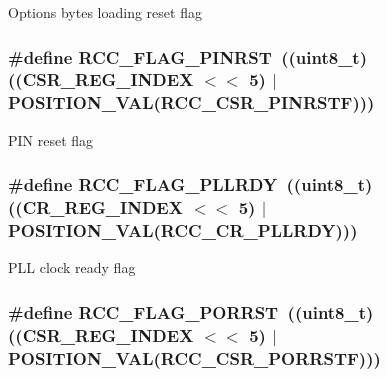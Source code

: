 Options bytes loading reset flag \hypertarget{group___r_c_c___flag_gabfc3ab5d4a8a94ec1c9f38794ce37ad6}{
\subsubsection[{R\-C\-C\-\_\-\-F\-L\-A\-G\-\_\-\-P\-I\-N\-R\-S\-T}]{\setlength{\rightskip}{0pt plus 5cm}\#define R\-C\-C\-\_\-\-F\-L\-A\-G\-\_\-\-P\-I\-N\-R\-S\-T~((uint8\-\_\-t)((C\-S\-R\-\_\-\-R\-E\-G\-\_\-\-I\-N\-D\-E\-X $<$$<$ 5) $\vert$ P\-O\-S\-I\-T\-I\-O\-N\-\_\-\-V\-A\-L({\bf R\-C\-C\-\_\-\-C\-S\-R\-\_\-\-P\-I\-N\-R\-S\-T\-F})))}}\label{group___r_c_c___flag_gabfc3ab5d4a8a94ec1c9f38794ce37ad6}
P\-I\-N reset flag \hypertarget{group___r_c_c___flag_gaf82d8afb18d9df75db1d6c08b9c50046}{
\subsubsection[{R\-C\-C\-\_\-\-F\-L\-A\-G\-\_\-\-P\-L\-L\-R\-D\-Y}]{\setlength{\rightskip}{0pt plus 5cm}\#define R\-C\-C\-\_\-\-F\-L\-A\-G\-\_\-\-P\-L\-L\-R\-D\-Y~((uint8\-\_\-t)((C\-R\-\_\-\-R\-E\-G\-\_\-\-I\-N\-D\-E\-X $<$$<$ 5) $\vert$ P\-O\-S\-I\-T\-I\-O\-N\-\_\-\-V\-A\-L({\bf R\-C\-C\-\_\-\-C\-R\-\_\-\-P\-L\-L\-R\-D\-Y})))}}\label{group___r_c_c___flag_gaf82d8afb18d9df75db1d6c08b9c50046}
P\-L\-L clock ready flag \hypertarget{group___r_c_c___flag_ga39ad309070f416720207eece5da7dc2c}{
\subsubsection[{R\-C\-C\-\_\-\-F\-L\-A\-G\-\_\-\-P\-O\-R\-R\-S\-T}]{\setlength{\rightskip}{0pt plus 5cm}\#define R\-C\-C\-\_\-\-F\-L\-A\-G\-\_\-\-P\-O\-R\-R\-S\-T~((uint8\-\_\-t)((C\-S\-R\-\_\-\-R\-E\-G\-\_\-\-I\-N\-D\-E\-X $<$$<$ 5) $\vert$ P\-O\-S\-I\-T\-I\-O\-N\-\_\-\-V\-A\-L({\bf R\-C\-C\-\_\-\-C\-S\-R\-\_\-\-P\-O\-R\-R\-S\-T\-F})))}}\label{group___r_c_c___flag_ga39ad309070f416720207eece5da7dc2c}

